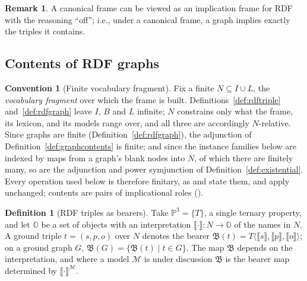 \documentclass[12pt]{article}
\theoremstyle{definition}
\newtheorem{definition}{Definition}
\newtheorem{convention}{Convention}
\newtheorem{remark}{Remark}
\newcommand{\tuple}[1]{\langle #1 \rangle}
\newcommand{\Pbb}{\mathbb{P}}   %
\newcommand{\Obb}{\mathbb{O}}   %
\newcommand{\sem}[1]{\llbracket #1 \rrbracket}  %
\newcommand{\bmap}{\mathfrak{B}}  %
\newcommand{\Mcal}{\mathcal{M}}   %
\begin{document}
\begin{remark}
\label{rem:canonicalframe}
A canonical frame can be viewed as an implication frame for RDF with the reasoning ``off''; i.e., under a canonical frame, a graph implies exactly the triples it contains.
\end{remark}

\subsection{Contents of RDF graphs}
\label{sec:contents}

\begin{convention}[Finite vocabulary fragment]
\label{conv:finiteness}
Fix a finite $N \subseteq I \cup L$, the \textit{vocabulary fragment} over which the frame is built. Definitions~\ref{def:rdftriple} and~\ref{def:rdfgraph} leave $I$, $B$ and $L$ infinite; $N$ constrains only what the frame, its lexicon, and its models range over, and all three are accordingly $N$-relative. Since graphs are finite (Definition~\ref{def:rdfgraph}), the adjunction of Definition~\ref{def:graphcontents} is finite; and since the instance families below are indexed by maps from a graph's blank nodes into $N$, of which there are finitely many, so are the adjunction and power symjunction of Definition~\ref{def:existential}. Every operation used below is therefore finitary, as \citet[Defs.~67, 69]{hlobil2025reasons} and \citet[Def.~10]{hlobil2026firstorder} state them, and \citet[Props.~105, 106]{hlobil2025reasons} apply unchanged; contents are pairs of implicational roles (\citealp[Defs.~65--66]{hlobil2025reasons}).
\end{convention}

\begin{definition}[RDF triples as bearers]
\label{def:triplebearers}
Take $\Pbb^{3} = \{T\}$, a single ternary property, and let $\Obb$ be a set of objects with an interpretation $\sem{\cdot}: N \rightarrow \Obb$ of the names in $N$. A ground triple $t = (s, p, o)$ over $N$ denotes the bearer $\bmap(t) = T\tuple{\sem{s}, \sem{p}, \sem{o}}$; on a ground graph $G$, $\bmap(G) = \{\bmap(t) \mid t \in G\}$. The map $\bmap$ depends on the interpretation, and where a model $\Mcal$ is under discussion $\bmap$ is the bearer map determined by $\sem{\cdot}^{\Mcal}$.
\end{definition}
\end{document}
